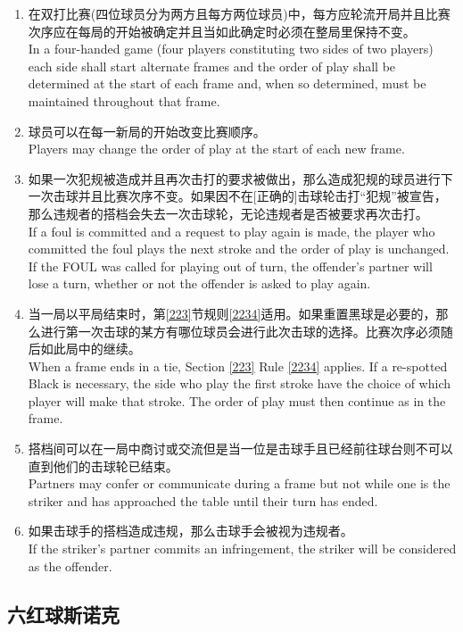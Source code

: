\begin{enumerate}[label=(\alph*)]
    \item 在双打比赛(四位球员分为两方且每方两位球员)中，每方应轮流开局并且比赛次序应在每局的开始被确定并且当如此确定时必须在整局里保持不变。\\
    In a four-handed game (four players constituting two sides of two players) each side shall start alternate frames and the order of play shall be determined at the start of each frame and, when so determined, must be maintained throughout that frame.
    \item 球员可以在每一新局的开始改变比赛顺序。\\
    Players may change the order of play at the start of each new frame.
    \item 如果一次犯规被造成并且再次击打的要求被做出，那么造成犯规的球员进行下一次击球并且比赛次序不变。如果因不在[正确的]击球轮击打``犯规''被宣告，那么违规者的搭档会失去一次击球轮，无论违规者是否被要求再次击打。\\
    If a foul is committed and a request to play again is made, the player who committed the foul plays the next stroke and the order of play is unchanged. If the FOUL was called for playing out of turn, the offender's partner will lose a turn, whether or not the offender is asked to play again.
    \item 当一局以平局结束时，第\ref{223}节规则\ref{2234}适用。如果重置黑球是必要的，那么进行第一次击球的某方有哪位球员会进行此次击球的选择。比赛次序必须随后如此局中的继续。\\
    When a frame ends in a tie, Section \ref{223} Rule \ref{2234} applies. If a re-spotted Black is necessary, the side who play the first stroke have the choice of which player will make that stroke. The order of play must then continue as in the frame.
    \item \label{22318e}搭档间可以在一局中商讨或交流但是当一位是击球手且已经前往球台则不可以直到他们的击球轮已结束。\\
    Partners may confer or communicate during a frame but not while one is the striker and has approached the table until their turn has ended. 
    \item 如果击球手的搭档造成违规，那么击球手会被视为违规者。\\
    If the striker's partner commits an infringement, the striker will be considered as the offender.
\end{enumerate}

\subsection{六红球斯诺克}

